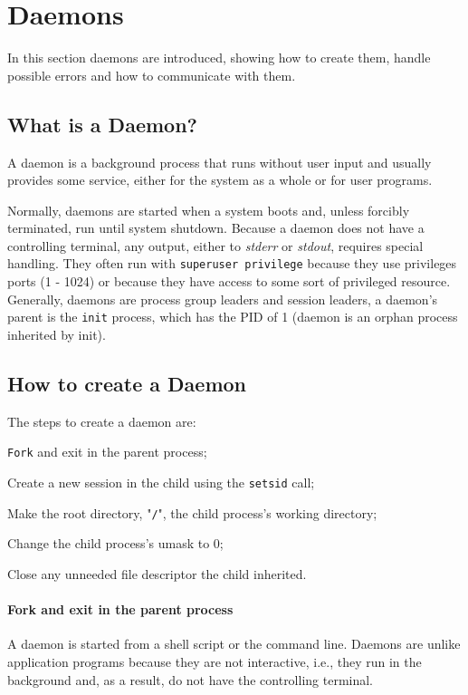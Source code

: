 \section{Daemons}
\label{sec:daemons}
In this section daemons are introduced, showing how to create them, handle
possible errors and how to communicate with them.
%
\subsection{What is a Daemon?}
A daemon is a background process that runs without user input and usually provides some service, either for the system as a whole or for user programs.~\cite{daemons-slides}

Normally, daemons are started when a system boots and, unless forcibly terminated, run until system shutdown.
Because a daemon does not have a controlling terminal, any output,
either to \textit{stderr} or \textit{stdout}, requires special handling.
They often run with \texttt{superuser privilege} because they use privileges
ports (1 - 1024) or because they have access to some sort of privileged resource.
Generally, daemons are process group leaders and session leaders, a daemon's parent is the \texttt{init} process, which has the PID of 1 (daemon is an orphan process inherited by init).

\subsection{How to create a Daemon}
The steps to create a daemon are:
%
\begin{enum-c}
\item \texttt{Fork} and exit in the parent process;
\item Create a new session in the child using the \texttt{setsid} call;
\item Make the root directory, "\texttt{/}", the child process's working directory;
\item Change the child process's umask to 0;
\item Close any unneeded file descriptor the child inherited.
\end{enum-c}

\paragraph{\textbf{Fork and exit in the parent process}}
%
A daemon is started from a shell script or the command line.
Daemons are unlike application programs because they are not interactive, i.e., they run in the background and, as a result, do not have the controlling terminal.

